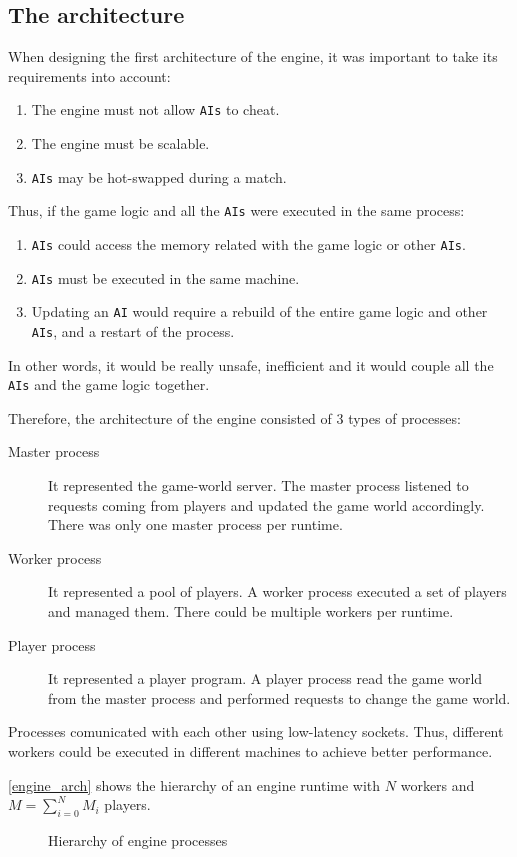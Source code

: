 \documentclass[a4paper,11pt,titlepage,abstract,numbers=noenddot,automark,mnsy,intlimits,rgb,dvipsnames]{report}
\begin{document}
\subsection{The architecture}
When designing the first architecture of the engine, it was important to take its requirements into account:
\begin{enumerate}
\item
The engine must not allow \texttt{AIs} to cheat.
\item
The engine must be scalable.
\item
\texttt{AIs} may be hot-swapped during a match.
\end{enumerate}
Thus, if the game logic and all the \texttt{AIs} were executed in the same process:
\begin{enumerate}
\item
\texttt{AIs} could access the memory related with the game logic or other \texttt{AIs}.
\item
\texttt{AIs} must be executed in the same machine.
\item
Updating an \texttt{AI} would require a rebuild of the entire game logic and other \texttt{AIs}, and a restart of the process.
\end{enumerate}
In other words, it would be really unsafe, inefficient and it would couple all the \texttt{AIs} and the game logic together.

Therefore, the architecture of the engine consisted of 3 types of processes:
\begin{description}
\item[Master process]
It represented the game-world server. The master process listened to requests coming from
  players and updated the game world accordingly. There was only one master process per runtime.
\item[Worker process]
It represented a pool of players. A worker process executed a set of players and
  managed them. There could be multiple workers per runtime.
\item[Player process]
It represented a player program. A player process read the game world from the
  master process and performed requests to change the game world.
\end{description}
Processes comunicated with each other using low-latency sockets. Thus, different workers could be executed
in different machines to achieve better performance.

\autoref{engine_arch} shows the hierarchy of an engine runtime with $N$ workers and $M = \sum_{i=0}^{N} M_i$ players.
\begin{figure}[H]
\begin{center}
\noindent\resizebox{\textwidth}{!}{

}
\end{center}
\caption{Hierarchy of engine processes}
\label{engine_arch}
\end{figure}
\end{document}

